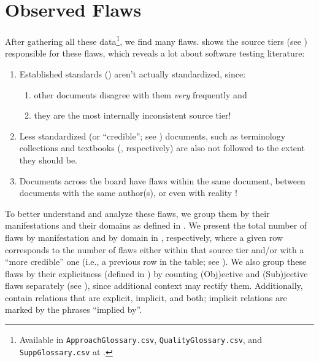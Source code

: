 \section{Observed Flaws}\label{flaws}


After gathering all these data\footnote{Available in \texttt{ApproachGlossary.csv},
    \texttt{QualityGlossary.csv}, and \texttt{SuppGlossary.csv} at .}, we find many
flaws.  shows the source tiers (see )
responsible for these flaws, which reveals a lot about software testing literature:
\begin{enumerate}
    \item Established standards () aren't actually standardized, since:
          \begin{enumerate}
              \item other documents disagree with them \emph{very} frequently and
              \item they are the most internally inconsistent source tier!
          \end{enumerate}
    \item Less standardized (or ``credible''; see ) documents,
          such as terminology collections and textbooks (,
          respectively) are also not followed to the extent they should be.
    \item Documents across the board have flaws within the same document,
          between documents with the same author(s), or even with reality%
          !
\end{enumerate}

\ifnotpaper
    \afterpage{}
\fi

To better understand and analyze these flaws, we group them by their
manifestations and their domains as defined in .
We present the total number of flaws by manifestation and by domain
in , respectively, where a given
row corresponds to the number of flaws either within that source tier and/or
with a ``more credible'' one (i.e., a previous row in the table; see
). We also group these flaws by their explicitness
(defined in ) by counting (Obj)ective and (Sub)jective flaws
separately (see ), since additional
context may rectify them.
\ifnotpaper Additionally, 
    contain relations that are explicit, implicit, and both; implicit relations
    are marked by the phrases ``implied by''. \fi

